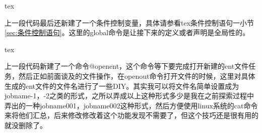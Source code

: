\documentclass[11pt,oneside]{book}
\begin{document}
\begin{common-format}
\begin{cverbatim}{tex}
%
%
%
\setcounter{@EndnoteCounter}{0}
\setcounter{@AllEndnoteCounter}{0}
\setcounter{@ShowEndnoteCounter}{1}

\newif\if@entopen \global\@entopenfalse
\end{cverbatim}
上一段代码最后还新建了一个条件控制变量，具体请参看tex条件控制语句一小节\ref{sec:条件控制语句}。这里的global命令是让接下来的定义或者声明是全局性的。

\begin{cverbatim}{tex}
\def\@openent{%
\def\@entname{\jobname
\ifnum\value{@ShowEndnoteCounter}<10 0\fi
\ifnum\value{@ShowEndnoteCounter}<100 0\fi
\arabic{@ShowEndnoteCounter}}%

\immediate\openout\@entout=\@entname.ent%
\global\@entopentrue
}%
\end{cverbatim}
上一段代码新建了一个命令@openent，这个命令等下要完成打开新建的ent文件任务，然后正如前面谈及的文件操作，在openout命令打开文件的时候，这里对具体生成的ent文件的文件名进行了一些DIY。其实我可以将文件名简单设置成为jobname-1，-2之类的形式，之所以弄成以上这种形式多少是我在之前探索过程中弄出的一种jobname001，jobname002这种形式，然后方便使用linux系统的cat命令来将他们汇总，后来修改修改着这个功能发现不需要了，但这个技巧还是很有用的就没删除了。


\end{common-format}
\end{document}
